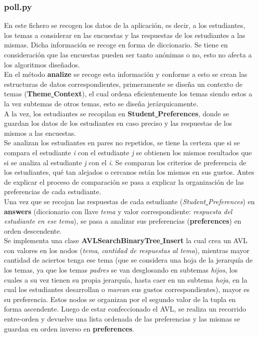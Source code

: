 \documentclass{book}
\begin{document}
			\subsubsection{poll.py}
				En este fichero se recogen los datos de la aplicaci\'on, es decir, a los estudiantes, los temas a considerar en las encuestas y las respuestas de los estudiantes a las mismas. Dicha informaci\'on se recoge en forma de diccionario. Se tiene en consideraci\'on que las encuestas pueden ser tanto an\'onimas o no, esto no afecta a los algoritmos dise\~nados. \\
				En el m\'etodo \textbf{analize} se recoge esta informaci\'on y conforme a esto se crean las estructuras de datos correspondientes, primeramente se dise\~na un contexto de temas (\textbf{Theme\underline{ }Context}), el cual ordena eficientemente los temas siendo estos a la vez subtemas de otros temas, esto se dise\~na jer\'arquicamente. \\
				A la vez, los estudiantes se recopilan en \textbf{Student\underline{ }Preferences}, donde se guardan los datos de los estudiantes en caso preciso y las respuestas de los mismos a las encuestas. \\
				Se analizan los estudiantes en pares no repetidos, se tiene la certeza que si se compara el estudiante \textit{i} con el estudiante \textit{j} se obtienen los mismos resultados que si se analiza al estudiante \textit{j} con el \textit{i}. Se comparan los criterios de preferencia de los estudiantes, qu\'e tan alejados o cercanos est\'an los mismos en sus gustos. Antes de explicar el proceso de comparaci\'on se pasa a explicar la organizaci\'on de las preferencias de cada estudiante. \\
				Una vez que se recojan las respuestas de cada estudiante (\textit{Student\underline{ }Preferences}) en \textbf{answers} (diccionario con llave \textit{tema} y valor correspondiente: \textit{respuesta del estudiante en ese tema}), se pasa a analizar sus preferencias (\textbf{preferences}) en orden descendente. \\
				Se implementa una clase \textbf{AVLSearchBinaryTree\underline{ }Insert} la cual crea un AVL con valores en los nodos (\textit{tema}, \textit{cantidad de respuestas al tema}), mientras mayor cantidad de aciertos tenga ese tema (que se considera una hoja de la jerarqu\'ia de los temas, ya que los temas \textit{padres} se van desglosando en subtemas \textit{hijos}, los cuales a su vez tienen su propia jerarqu\'ia, hasta caer en un subtema \textit{hoja}, en la cual los estudiantes desarrollan o \textit{marcan} sus gustos correspondientes), mayor es su preferencia. Estos nodos se organizan por el segundo valor de la tupla en forma ascendente. Luego de estar confeccionado el AVL, se realiza un recorrido entre-orden y devuelve una lista ordenada de las preferencias y las mismas se guardan en orden inverso en \textbf{preferences}. \\
\end{document}
